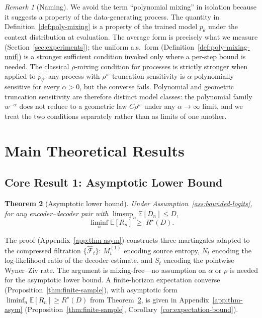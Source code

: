\documentclass[11pt]{article}
\newcommand{\E}{\mathbb{E}}
\newcommand{\F}{\mathcal{F}}
\newcommand{\Fhat}{\hat{\F}}
\theoremstyle{plain}
\newtheorem{theorem}{Theorem}[section]
\theoremstyle{definition}
\theoremstyle{remark}
\newtheorem{remark}[theorem]{Remark}
\begin{document}
\begin{remark}[Naming]
We avoid the term ``polynomial mixing'' in isolation because it
suggests a property of the data-generating process. The quantity in
Definition~\ref{def:poly-mixing} is a property of the trained model
$p_\theta$ under the context distribution at evaluation. The average
form is precisely what we measure (Section~\ref{sec:experiments}); the
uniform a.s.\ form (Definition~\ref{def:poly-mixing-unif}) is a
stronger sufficient condition invoked only where a per-step bound is
needed. The classical $\rho$-mixing
condition for processes is strictly stronger when applied to
$p_\theta$: any process with $\rho^w$ truncation sensitivity is
$\alpha$-polynomially sensitive for every $\alpha > 0$, but the
converse fails. Polynomial and geometric truncation sensitivity are
therefore distinct model classes: the polynomial family $w^{-\alpha}$
does not reduce to a geometric law $C\rho^w$ under any $\alpha\to\infty$
limit, and we treat the two conditions separately rather than as
limits of one another.
\end{remark}

\section{Main Theoretical Results}
\label{sec:main}

\subsection{Core Result 1: Asymptotic Lower Bound}

\begin{theorem}[Asymptotic lower bound]\label{thm:asymptotic}
Under Assumption~\ref{ass:bounded-logits}, for any
encoder--decoder pair with $\limsup_n \E[D_n] \leq D$,
\[
\liminf_{n} \E[R_n] \;\geq\; R^\star(D).
\]
\end{theorem}

The proof (Appendix~\ref{app:thm-asym}) constructs three martingales
adapted to the compressed filtration $\{\Fhat_t\}$: $M_t^{(1)}$
encoding source entropy, $N_t$ encoding the log-likelihood ratio of
the decoder estimate, and $S_t$ encoding the pointwise
Wyner--Ziv rate. The argument is mixing-free---no assumption on
$\alpha$ or $\rho$ is needed for the asymptotic lower bound. A
finite-horizon expectation converse (Proposition~\ref{thm:finite-sample}),
with asymptotic form $\liminf_n\E[R_n] \ge R^\star(D)$ from
Theorem~\ref{thm:asymptotic}, is given in
Appendix~\ref{app:thm-asym} (Proposition~\ref{thm:finite-sample},
Corollary~\ref{cor:expectation-bound}).
\end{document}
